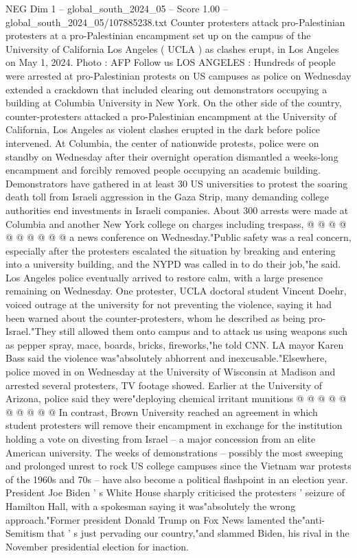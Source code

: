 \begin{textsample}{NEG Dim 1 – global\_south\_2024\_05 – Score 1.00 – global\_south\_2024\_05/107885238.txt}  \label{ex:f1_neg_369}
Counter protesters attack pro-Palestinian protesters at a pro-Palestinian encampment set up on the campus of the University of California Los Angeles ( UCLA ) as clashes erupt, in Los Angeles on May 1, 2024.
Photo : AFP Follow us LOS ANGELES : Hundreds of people were arrested at pro-Palestinian protests on US campuses as police on Wednesday extended a crackdown that included clearing out demonstrators occupying a building at Columbia University in New York.
On the other side of the country, counter-protesters attacked a pro-Palestinian encampment at the University of California, Los Angeles as violent clashes erupted in the dark before police intervened.
At Columbia, the center of nationwide protests, police were on standby on Wednesday after their overnight operation dismantled a weeks-long encampment and forcibly removed people occupying an academic building.
Demonstrators have gathered in at least 30 US universities to protest the soaring death toll from Israeli aggression in the Gaza Strip, many demanding college authorities end investments in Israeli companies.
About 300 arrests were made at Columbia and another New York college on charges including trespass, @ @ @ @ @ @ @ @ @ @ a news conference on Wednesday."Public safety was a real concern, especially after the protesters escalated the situation by breaking and entering into a university building, and the NYPD was called in to do their job,"he said.
Los Angeles police eventually arrived to restore calm, with a large presence remaining on Wednesday.
One protester, UCLA doctoral student Vincent Doehr, voiced outrage at the university for not preventing the violence, saying it had been warned about the counter-protesters, whom he described as being pro-Israel."They still allowed them onto campus and to attack us using weapons such as pepper spray, mace, boards, bricks, fireworks,"he told CNN.
LA mayor Karen Bass said the violence was"absolutely abhorrent and inexcusable."Elsewhere, police moved in on Wednesday at the University of Wisconsin at Madison and arrested several protesters, TV footage showed.
Earlier at the University of Arizona, police said they were"deploying chemical irritant munitions @ @ @ @ @ @ @ @ @ @ In contrast, Brown University reached an agreement in which student protesters will remove their encampment in exchange for the institution holding a vote on divesting from Israel -- a major concession from an elite American university.
The weeks of demonstrations -- possibly the most sweeping and prolonged unrest to rock US college campuses since the Vietnam war protests of the 1960s and 70s -- have also become a political flashpoint in an election year.
President Joe Biden ' s White House sharply criticised the protesters ' seizure of Hamilton Hall, with a spokesman saying it was"absolutely the wrong approach."Former president Donald Trump on Fox News lamented the"anti-Semitism that ' s just pervading our country,"and slammed Biden, his rival in the November presidential election for inaction.

\end{textsample}
